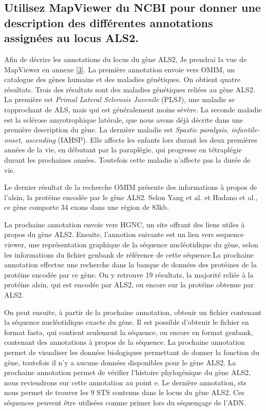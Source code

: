 \documentclass[11pt]{article} %
\begin{document}
\subsection[Annotations du gène ALS2]{Utilisez MapViewer du NCBI pour donner une description des différentes annotations
assignées au locus ALS2.}

Afin de décrire les annotations du locus du gène ALS2, Je prendrai la vue de MapViewer en annexe \ref{3}. La première annotation envoie
vers OMIM, un catalogue des gènes humains et des maladies génétiques. On obtient quatre résultats. Trois des résultats
sont des maladies génétiques reliées au gène ALS2. La première est \emph{Primal Lateral Sclerosis Juvenile} (PLSJ), une maladie
se rapprochant de ALS, mais qui est généralement moins sévère. La seconde maladie est la sclérose amyotrophique latérale, que nous
avons déjà décrite dans une première description du gène. La dernière maladie est \emph{Spastic paralysis, infantile-onset, ascending}
 (IAHSP). Elle affecte les enfants lors durant les deux premières années de la vie, en débutant par la paraplégie, qui progresse
en tétraplégie durant les prochaines années. Toutefois cette maladie n'affecte pas la durée de vie. 

Le dernier résultat de la recherche OMIM présente des informations à propos de l'alsin, la protéine encodée par le gène ALS2. Selon
Yang et al. et Hadano et al., ce gène comporte 34 exons dans une région de 83kb.

La prochaine annotation envoie vers HGNC, un site offrant des liens utiles à propos du gène ALS2. Ensuite, l'annotion suivante 
est un lien vers sequence viewer, une représentation graphique de la séquence nucléotidique du gène, selon les informations
du fichier genbank de référence de cette séquence.La prochaine annotation effectue une recherche dans la banque de données
des protéines de la protéine encodée par ce gène. On y retrouve 19 résultats, la majorité reliée à la protéine alsin, qui est
encodée par ALS2, ou encore sur la protéine obtenue par ALS2. 

On peut ensuite, à partir de la prochaine annotation, obtenir un fichier contenant la séquence nucléotidique exacte du gène.
Il est possible d'obtenir le fichier en format fasta, qui contient seulement la séquence, ou encore en format genbank, contenant
des annotations à propos de la séquence. La prochaine annotation permet de visualiser les données biologiques permettant
de donner la fonction du gène, toutefois il n'y a aucune données disponibles pour le gène ALS2. La prochaine annotation permet
de vérifier l'histoire phylogénique du gène ALS2, nous reviendrons sur cette annotation au point e. Le dernière annotation, sts
nous permet de trouver les 9 STS contenus dans le locus du gène ALS2. Ces séquences peuvent être utilisées comme primer lors
du séquençage de l'ADN.
\end{document}
